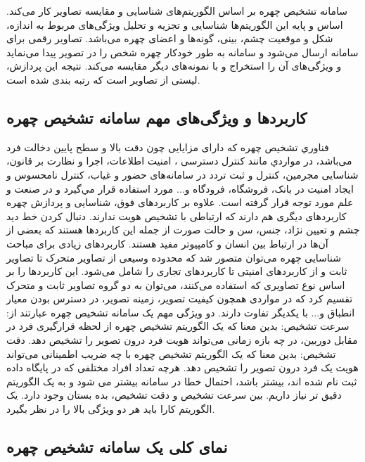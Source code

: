 سامانه تشخیص چهره بر اساس الگوریتم‌های شناسایی و مقایسه تصاویر کار می‌کند. اساس و پایه این الگوریتم‌ها شناسایی و تجزیه و تحلیل ویژگی‌های مربوط به اندازه، شکل و موقعیت چشم، بینی، گونه‌ها و 
اعضای چهره می‌باشد. تصاویر رقمی برای سامانه ارسال می‌شود و سامانه به طور خودکار چهره شخص را در تصویر پیدا می‌نماید و ویژگی‌های آن را استخراج و با نمونه‌های دیگر مقایسه می‌کند. نتیجه این پردازش، لیستی از تصاویر است که رتبه بندی شده است.


\subsection{کاربردها و ویژگی‌های مهم سامانه تشخیص چهره}

فناوري تشخیص چهره که دارای مزايايی چون دقت بالا و سطح پايين دخالت فرد می‌باشد، در مواردي مانند کنترل دسترسی ، امنيت اطلاعات، اجرا و نظارت بر قانون، شناسایی مجرمین، کنترل و ثبت تردد در سامانه‌های حضور و غیاب، کنترل نامحسوس و ایجاد امنیت در بانک، فروشگاه، فرودگاه و... مورد استفاده قرار مي‌گيرد و در صنعت و علم مورد توجه قرار گرفته است.
علاوه بر کاربردهای فوق، شناسایی و پردازش چهره کاربردهای دیگری هم دارند که ارتباطی با تشخیص هویت ندارند. دنبال کردن خط دید چشم و تعیین نژاد، جنس، سن و حالت صورت از جمله این کاربردها هستند که بعضی از آن‌ها در ارتباط بین انسان و کامپیوتر مفید هستند. کاربردهای زیادی برای مباحث شناسایی چهره می‌توان متصور شد که محدوده وسیعی از تصاویر متحرک تا تصاویر ثابت و از کاربردهای امنیتی تا کاربردهای تجاری را شامل می‌شود. این کاربردها را بر اساس نوع تصاویری که استفاده می‌کنند، می‌توان به دو گروه تصاویر ثابت و متحرک تقسیم کرد که در مواردی همچون کیفیت تصویر، زمینه تصویر، در دسترس بودن معیار انطباق و... با یکدیگر تفاوت دارند. دو ویژگی مهم یک سامانه تشخیص چهره عبارتند از:
سرعت تشخیص: بدین معنا که یک الگوریتم تشخیص چهره از لحظه قرارگیری فرد در مقابل دوربین، در چه بازه زمانی می‌تواند هویت فرد درون تصویر را تشخیص دهد.
دقت تشخیص: بدین معنا که یک الگوریتم تشخیص چهره با چه ضریب اطمینانی می‌تواند هویت یک فرد درون تصویر را تشخیص دهد. هرچه تعداد افراد مختلفی که در پایگاه داده ثبت نام شده اند، بیشتر باشد، احتمال خطا در سامانه بیشتر می شود و به یک الگوریتم دقیق تر نیاز داریم.
بین سرعت تشخیص و دقت تشخیص، بده بستان  وجود دارد. یک الگوریتم کارا باید هر دو ویژگی بالا را در نظر بگیرد.


\subsection{نمای کلی یک سامانه تشخیص چهره}

